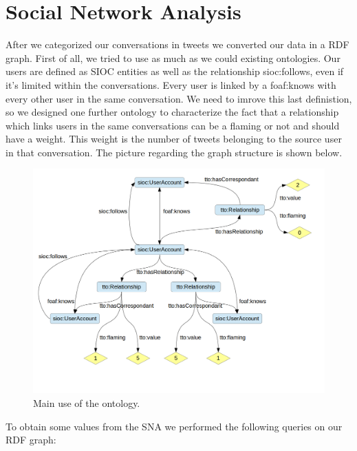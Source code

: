 \documentclass[a4paper,10pt, english]{report}
\begin{document}
\section{Social Network Analysis}
After we categorized our conversations in tweets we converted our data in a RDF graph.
First of all, we tried to use as much as we could existing ontologies.
Our users are defined as SIOC entities as well as the relationship sioc:follows, even if it's limited within the conversations.
Every user is linked by a foaf:knows with every other user in the same conversation.
We need to imrove this last definistion, so we designed one further ontology to characterize the fact that a relationship which links users in the same conversations can be a flaming or not and should have a weight.
This weight is the number of tweets belonging to the source user in that conversation.
The picture regarding the graph structure is shown below.
\begin{figure}[h!]
 \centering
    \includegraphics[scale=0.5]{diag2.png}
    \caption{Main use of the ontology.}
\end{figure}
To obtain some values from the SNA we performed the following queries on our RDF graph:
\end{document}
